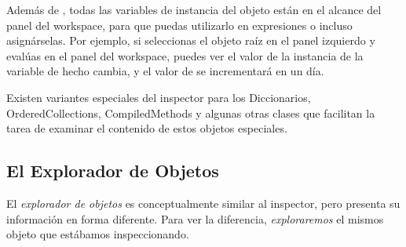 \documentclass[spanish,a4paper,10pt,twoside]{book}
\begin{document}
Adem\'as de , todas las variables de instancia del objeto est\'an en el alcance del panel del workspace, para que puedas utilizarlo en expresiones o incluso asign\'arselas.  Por ejemplo, si seleccionas el objeto ra\'iz en el panel izquierdo y eval\'uas  en el panel del workspace, puedes ver el valor de la instancia de la variable  de hecho cambia, y el valor de  se incrementar\'a en un d\'ia.


Existen variantes especiales del inspector para los Diccionarios, OrderedCollections, CompiledMethods y algunas otras clases que facilitan la tarea de examinar el contenido de estos objetos especiales.

\subsection{El Explorador de Objetos}

El \emph{explorador de objetos} es conceptualmente similar al inspector, pero presenta su informaci\'on en forma diferente.
Para ver la diferencia, \emph{exploraremos} el mismos objeto que est\'abamos inspeccionando.
\end{document}
